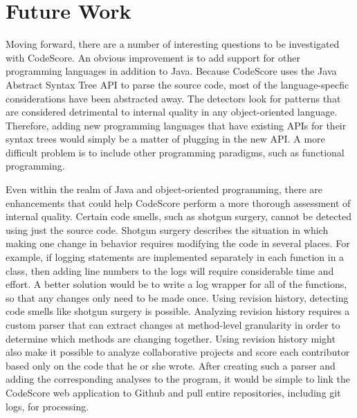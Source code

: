 \documentclass{sig-alternate}
\begin{document}
\section {Future Work}
Moving forward, there are a number of interesting questions to be investigated
with CodeScore. An obvious improvement is to add support for other programming
languages in addition to Java. Because CodeScore uses the Java Abstract Syntax
Tree API to parse the source code, most of the language-specfic considerations
have been abstracted away. The detectors look for patterns that are considered
detrimental to internal quality in any object-oriented language. Therefore, adding new programming
languages that have existing APIs for their syntax trees would simply be a
matter of plugging in the new API. A more difficult problem is to include other
programming paradigms, such as functional programming.

Even within the realm of Java and object-oriented programming, there are
enhancements that could help CodeScore perform a more thorough assessment of
internal quality.
Certain code smells, such as shotgun surgery, cannot be detected using just the
source code. Shotgun surgery describes the situation in which making one
change in behavior requires modifying the code in several places. For
example, if logging statements are implemented separately in each function in a
class, then adding line numbers to the logs will require considerable time and effort. A
better solution would be to write a log wrapper for all of the functions, so
that any changes only need to be made once. 
Using
revision history, detecting code smells like shotgun surgery is possible. Analyzing revision
history requires a custom parser that can extract changes at method-level
granularity in order to determine which methods are changing together. Using
revision history might also make it possible to analyze collaborative projects
and score each contributor based only on the code that he or she wrote. After
creating such a parser and adding the corresponding analyses to the program, it 
would be simple to link the CodeScore web application to Github and pull entire repositories,
including git logs, for processing. 
\end{document}

